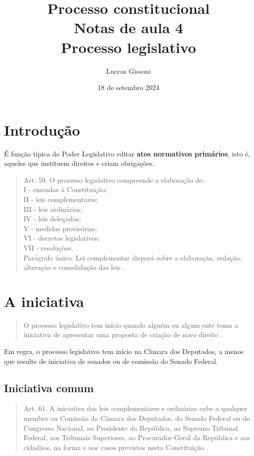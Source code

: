 \documentclass{article}
\title{%
 Processo constitucional \\
  \Large Notas de aula 4 \\
  \large Processo legislativo}
\author{Luccas Gissoni}
\date{18 de setembro 2024}
\begin{document}
\maketitle
\tableofcontents

\section{Introdução}

É função típica do Poder Legislativo editar \textbf{atos normativos primários}, isto é, aqueles que instituem direitos e criam obrigações.

\begin{quote}
    Art. 59. O processo legislativo compreende a elaboração de:\\
    I - emendas à Constituição;\\
    II - leis complementares;\\
    III - leis ordinárias;\\
    IV - leis delegadas;\\
    V - medidas provisórias;\\
    VI - decretos legislativos;\\
    VII - resoluções.\\
    Parágrafo único. Lei complementar disporá sobre a elaboração, redação, alteração e consolidação das leis \cite{brasil_constituicao_1988}. 
\end{quote}

\section{A iniciativa}

\begin{quote}
    O processo legislativo tem início quando alguém ou algum ente toma a iniciativa de apresentar uma proposta de criação de novo direito \cite[p.~156]{mendes_curso_2024}.
\end{quote}

Em regra, o processo legislativo tem início na Câmara dos Deputados, a menos que resulte de iniciativa de senador ou de comissão do Senado Federal.

\subsection{Iniciativa comum}

\begin{quote}
    Art. 61. A iniciativa das leis complementares e ordinárias cabe a qualquer membro ou Comissão da Câmara dos Deputados, do Senado Federal ou do Congresso Nacional, ao Presidente da República, ao Supremo Tribunal Federal, aos Tribunais Superiores, ao Procurador-Geral da República e aos cidadãos, na forma e nos casos previstos nesta Constituição \cite{brasil_constituicao_1988}.
\end{quote}
\end{document}
